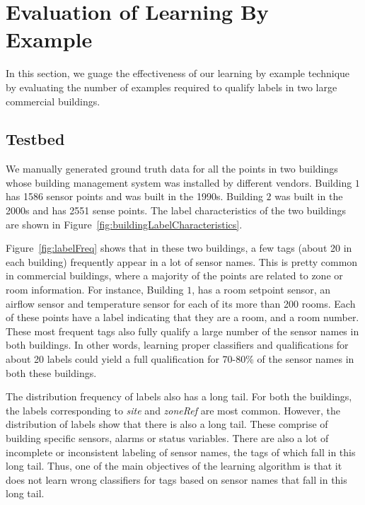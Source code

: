 \section{Evaluation of Learning By Example}
\label{sec:eval}

In this section, we guage the effectiveness of our learning by example technique by evaluating the number of examples required to qualify labels in two large commercial buildings. 

\subsection{Testbed}

We manually generated ground truth data for all the points in two buildings whose building management system was installed by different vendors. Building $1$ has 1586 sensor points and was built in the 1990s. Building $2$ was built in the 2000s and has 2551 sense points. The label characteristics of the two buildings are shown in Figure~\ref{fig:buildingLabelCharacteristics}. 

Figure~\ref{fig:labelFreq} shows that in  these two buildings, a few tags (about 20 in each building) frequently appear in a lot of sensor names. This is pretty common in commercial buildings, where a majority of the points are related to zone or room information. For instance, Building $1$, has a room setpoint sensor, an airflow sensor and temperature sensor for each of its more than 200 rooms. Each of these points have a label indicating that they are a room, and a room number. These most frequent tags also fully qualify a large number of the sensor names in both buildings. In other words, learning proper classifiers and qualifications for about 20 labels could yield a full qualification for 70-80\% of the sensor names in both these buildings.

The distribution frequency of labels also has a long tail. For both the buildings, the labels corresponding to {\it site} and {\it zoneRef} are most common. However, the distribution of labels show that there is also a long tail. These comprise of building specific sensors, alarms or status variables. There are also a lot of incomplete or inconsistent labeling of sensor names, the tags of which fall in this long tail. Thus, one of the main objectives of the learning algorithm is that it does not learn wrong classifiers for tags based on sensor names that fall in this long tail.

